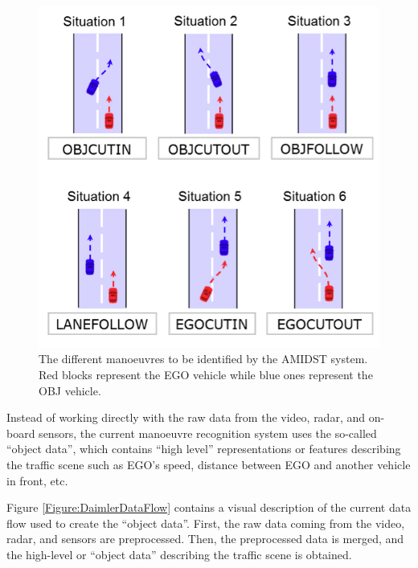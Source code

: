 \begin{figure}[ht!]
\begin{center}
\includegraphics[scale=0.4]{./figures/DaimlerManeuvers}
\caption{\label{Figure:DaimlerManeuvers}The different manoeuvres to be identified by the AMIDST system. Red blocks represent the EGO vehicle while blue ones represent the OBJ vehicle.}
\end{center}
\end{figure}

Instead of working directly with the raw data from the video, radar, and on-board sensors, the current manoeuvre recognition system uses the so-called ``object data'', which contains ``high level'' representations or features describing the traffic scene such as EGO's speed, distance between EGO and another vehicle in front, etc.  

Figure \ref{Figure:DaimlerDataFlow} contains a visual description of the current data flow used to create the ``object data''.  First, the raw data coming from the video, radar, and sensors are preprocessed. Then, the preprocessed data is merged, and the high-level or ``object data'' describing the traffic scene is obtained. 

